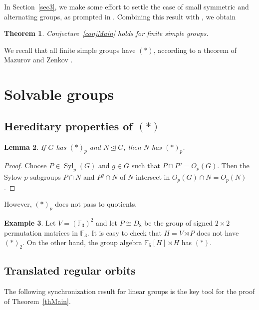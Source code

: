 \documentclass[11pt]{amsart}
\numberwithin{equation}{section}
\newtheorem{theorem}{Theorem}[section]
\newtheorem{lemma}[theorem]{Lemma}
\theoremstyle{definition}
\newtheorem{example}[theorem]{Example}
\theoremstyle{remark}
\newcommand{\Syl}{\mathop{\mathrm{Syl}}}
\begin{document}
In Section~\ref{sec3}, we make some effort to settle the case of small symmetric and alternating groups, as prompted in \cite[Remark~7]{BH26}.
Combining this result with \cite[Theorem~A]{BH26}, we obtain

\begin{theorem} \label{thSimple}
Conjecture~\ref{conjMain} holds for finite simple groups.
\end{theorem}

We recall that all finite simple groups have $(*)$,
according to a theorem of Mazurov and Zenkov \cite{MZ96}.









\vspace{0.1cm}
\section{Solvable groups} \label{sec2}

\subsection{Hereditary properties of $(*)$}

\begin{lemma} \label{lem:normal}
If $G$ has $(*)_p$ and $N \unlhd G$, then $N$ has $(*)_p$.
\end{lemma}
\begin{proof}
Choose $P \in \Syl_p(G)$ and $g \in G$ such that $P \cap P^g = O_p(G)$.
Then the Sylow $p$-subgroups $P \cap N$ and $P^g \cap N$ of $N$
intersect in $O_p(G) \cap N = O_p(N)$.
\end{proof}

However, $(*)_p$ does not pass to quotients.

\begin{example} \label{ex:Q}
Let $V = (\mathbb{F}_3)^2$ and let $P \cong D_8$ be
the group of signed $2 \times 2$ permutation matrices in $\mathbb{F}_3$.
It is easy to check that $H =V \rtimes P$ does not have $(*)_2$.
On the other hand, the group algebra $\mathbb{F}_5[H] \rtimes H$ has $(*)$.
\end{example}

\subsection{Translated regular orbits} 

The following synchronization result for linear groups
is the key tool for the proof of Theorem~\ref{thMain}.
\end{document}
